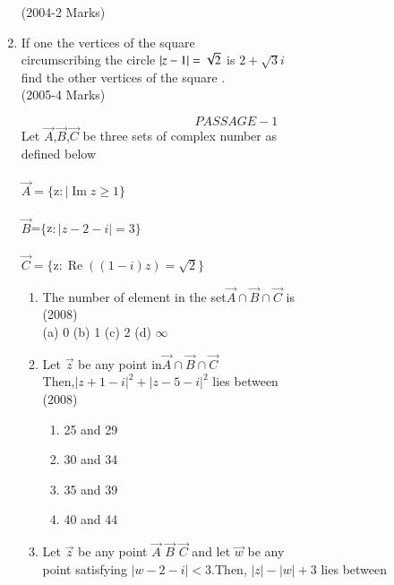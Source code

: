 \documentclass[journal]{IEEEtran}
\theoremstyle{remark}
\begin{document}
\begin{enumerate}[start=7]
\hfill(2004-2 Marks) \\
      
\item If one the vertices of the square \\
circumscribing the circle $\left\vert z-1\right\vert = \sqrt{2}$ is $2 +\sqrt{3} i $ \\      
find the other vertices of the square .\\

\hfill (2005-4 Marks) \\
\newpage



$$PASSAGE-1$$
Let $\vec{A}$,$\vec{B}$,$\vec{C}$ be three sets of complex number as\\ 
defined below\\\\
$\vec{A} = \{ $z$ :\mid \operatorname{Im} z \geq 1 \}$\\\\
$\vec{B}$=$\{$z$:|z-2-i|=3\}$\\\\
$\vec{C} = \{$z$ : \operatorname{Re} \left((1-i)z\right) = \sqrt{2} \}$\\
\begin{enumerate}     
\item The number of element in the set$\vec{A} \cap\vec{B} \cap\vec{C} $
is\\ 

\hfill (2008)\\
   (a) 0 \hfill
   (b) 1 \hfill
   (c) 2 \hfill
   (d) $\infty$\\
\item Let $\vec{z}$ be any point in$ \vec{A}\cap\vec{B}\cap\vec{C} $\\
 Then,$|z+1-i|^2+|z-5-i|^2$ lies between\\
 
 \hfill  (2008) \\
\begin{multicols}{2}
    \begin{enumerate}
        \item 25 and 29
        \item 30 and 34
        \item 35 and 39
        \item 40 and 44
    \end{enumerate}
\end{multicols}
\item  Let $\vec{z}$ be any point $\vec{A}$ $\vec{B}$ $\vec{C}$ and let $\vec{w}$ be any\\
point satisfying $|w-2-i|<3$.Then, $|z|-|w|+3$ lies between\\
   

\end{enumerate}
\end{enumerate}
\end{document}
